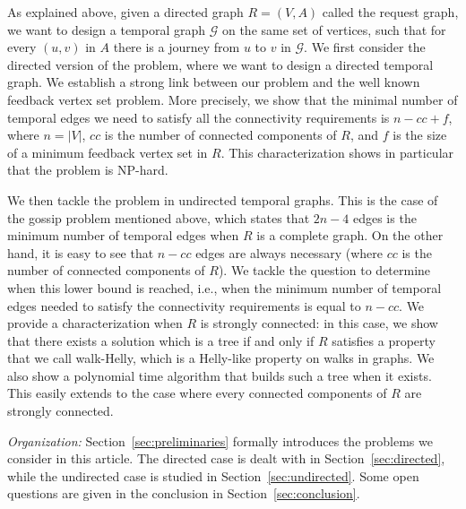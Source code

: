 \documentclass[11pt]{article}%
\begin{document}

As explained above, given a directed graph $R=(V,A)$ called the request graph, we want to design a temporal graph $\mathcal{G}$ on the same set of vertices, such that for every $(u,v)$ in $A$ there is a journey from $u$ to $v$ in $\mathcal{G}$. We first consider the directed version of the problem, where we want to design a directed temporal graph. We establish a strong link between our problem and the well known feedback vertex set problem. More precisely, we show that the minimal number of temporal edges we need to satisfy all the connectivity requirements is $n-cc+f$, where $n=|V|$, $cc$ is the number of connected components of $R$, and $f$ is the size of a minimum feedback vertex set in $R$. This characterization shows in particular that the problem is NP-hard.

We then tackle the problem in undirected temporal graphs. This is the case of the gossip problem mentioned above, which states that $2n-4$ edges is the minimum number of temporal edges when $R$ is a complete graph. On the other hand, it is easy to see that $n-cc$ edges are always necessary (where $cc$ is the number of connected components of $R$). We tackle the question to determine when this lower bound is reached, i.e., when the minimum number of temporal edges needed to satisfy the connectivity requirements is equal to $n-cc$. We provide a characterization when $R$ is strongly connected: in this case, we show that there exists a solution which is a tree if and only if $R$ satisfies a property that we call walk-Helly, which is a Helly-like property on walks in graphs. We also show a polynomial time algorithm that builds such a tree when it exists. This easily extends to the case where every connected components of $R$ are strongly connected.

{\it Organization:} Section~\ref{sec:preliminaries} formally introduces the problems we consider in this article. The directed case is dealt with in Section~\ref{sec:directed}, while the undirected case is studied in Section~\ref{sec:undirected}. Some open questions are given in the conclusion in Section~\ref{sec:conclusion}.\\ 

\end{document}
